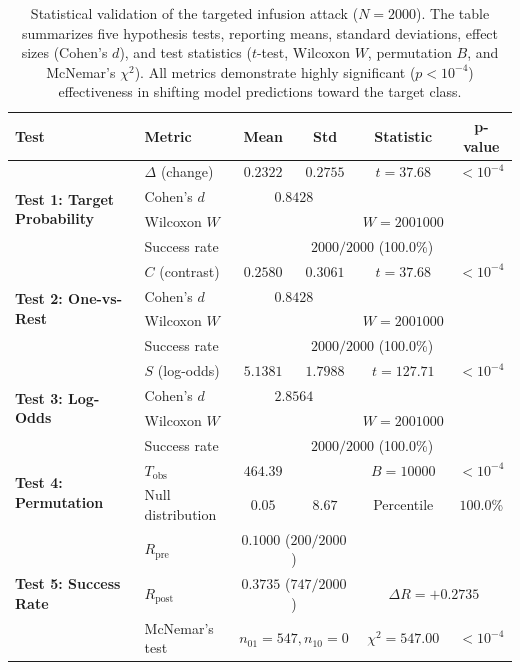 \documentclass{article}
\theoremstyle{plain}
\theoremstyle{definition}
\theoremstyle{remark}
\begin{document}
\begin{table}[h!]
\centering
\caption{Statistical validation of the targeted infusion attack ($N=2000$). The table summarizes five hypothesis tests, reporting means, standard deviations, effect sizes (Cohen's $d$), and test statistics ($t$-test, Wilcoxon $W$, permutation $B$, and McNemar's $\chi^2$). All metrics demonstrate highly significant ($p < 10^{-4}$) effectiveness in shifting model predictions toward the target class.}
\label{tab:statistical_tests}
\begin{tabular}{llcccc}
\toprule
\textbf{Test} & \textbf{Metric} & \textbf{Mean} & \textbf{Std} & \textbf{Statistic} & \textbf{p-value} \\
\midrule
\multirow{4}{*}{\textbf{Test 1: Target Probability}} & $\Delta$ (change) & $0.2322$ & $0.2755$ & $t=37.68$ & $<10^{-4}$ \\
& Cohen's $d$ & \multicolumn{2}{c}{$0.8428$} & \multicolumn{2}{c}{} \\
& Wilcoxon $W$ & \multicolumn{2}{c}{} & $W=2001000$ &  \\
& Success rate & \multicolumn{4}{c}{$2000/2000$ (100.0\%)} \\
\midrule
\multirow{4}{*}{\textbf{Test 2: One-vs-Rest}} & $C$ (contrast) & $0.2580$ & $0.3061$ & $t=37.68$ & $<10^{-4}$ \\
& Cohen's $d$ & \multicolumn{2}{c}{$0.8428$} & \multicolumn{2}{c}{} \\
& Wilcoxon $W$ & \multicolumn{2}{c}{} & $W=2001000$ &\\
& Success rate & \multicolumn{4}{c}{$2000/2000$ (100.0\%)} \\
\midrule
\multirow{4}{*}{\textbf{Test 3: Log-Odds}} & $S$ (log-odds) & $5.1381$ & $1.7988$ & $t=127.71$ & $<10^{-4}$ \\
& Cohen's $d$ & \multicolumn{2}{c}{$2.8564$} & \multicolumn{2}{c}{} \\
& Wilcoxon $W$ & \multicolumn{2}{c}{} & $W=2001000$ & \\
& Success rate & \multicolumn{4}{c}{$2000/2000$ (100.0\%)} \\
\midrule
\multirow{2}{*}{\textbf{Test 4: Permutation}} & $T_{\text{obs}}$ & $464.39$ & & $B=10000$ & $<10^{-4}$ \\
& Null distribution & $0.05$ & $8.67$ & Percentile & $100.0$\% \\
\midrule
\multirow{3}{*}{\textbf{Test 5: Success Rate}} & $R_{\text{pre}}$ & \multicolumn{2}{c}{$0.1000$ ($200/2000$)} & \multicolumn{2}{c}{} \\
& $R_{\text{post}}$ & \multicolumn{2}{c}{$0.3735$ ($747/2000$)} & \multicolumn{2}{c}{$\Delta R = +0.2735$} \\
& McNemar's test & \multicolumn{2}{c}{$n_{01}=547, n_{10}=0$} & $\chi^2=547.00$ & $<10^{-4}$ \\
\bottomrule
\end{tabular}
\end{table}
\end{document}
